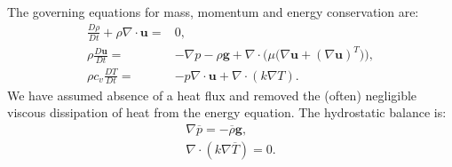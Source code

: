 \documentclass[preprint,12pt]{article}
\begin{document}
The governing equations for mass, momentum and energy conservation are:
 \begin{subequations}\begin{align}
 	\frac{D{{\rho}}}{D{t}}+\rho\nabla\cdot\mathbf{u}=&0,\\
 	\rho\frac{D{\mathbf{u}}}{D{t}}=&-{\nabla} {p}-\rho \mathbf{g} +{\nabla}\cdot\Big({\mu}\big({\nabla} \mathbf{{u}}+({\nabla} \mathbf{{u}})^T\big)\Big),\\
 	\rho c_v \frac{D{T}}{D{t}}=&-p\nabla\cdot\mathbf{u}+\nabla\cdot(k\nabla T).
 	\end{align}\end{subequations}
We have assumed absence of a heat flux and removed the (often) negligible viscous dissipation of heat from the energy equation. The hydrostatic balance is:
 \begin{subequations}\begin{align}
\nabla \overline{p}=-\overline{\rho}\mathbf{g},\\
\nabla\cdot(k\nabla \overline{T})=0.
 	\end{align}\end{subequations}
\end{document}
